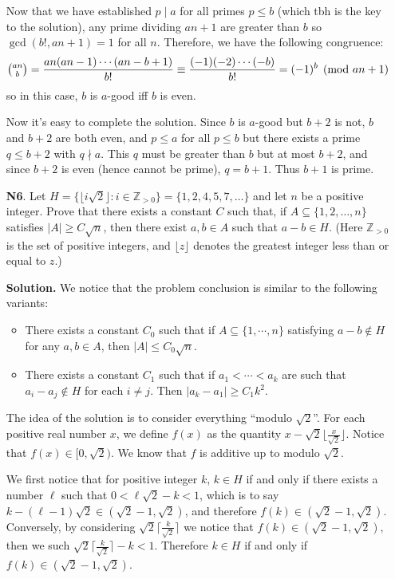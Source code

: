 \documentclass[11pt,a4paper]{article}
\begin{document}
\begin{enumerate}
	Now that we have established $p\mid a$ for all primes $p\le b$ (which tbh is the key to the solution), any prime dividing $an+1$ are greater than $b$ so $\gcd(b!, an+1)=1$ for all $n$. Therefore, we have the following congruence:
	$$
	\tbinom{an}{b}=\frac{an(an-1)\cdots (an-b+1)}{b!}\equiv\frac{(-1)(-2)\cdots (-b)}{b!}=(-1)^b\pmod{an+1}
	$$so in this case, $b$ is $a$-good iff $b$ is even.
	
	Now it's easy to complete the solution. Since $b$ is $a$-good but $b+2$ is not, $b$ and $b+2$ are both even, and $p\le a$ for all $p\le b$ but there exists a prime $q\le b+2$ with $q\nmid a$. This $q$ must be greater than $b$ but at most $b+2$, and since $b+2$ is even (hence cannot be prime), $q=b+1$. Thus $b+1$ is prime.
	
	\item[\textbf{N6}.] Let $H = \{ \lfloor i\sqrt{2}\rfloor : i \in \mathbb Z_{>0}\} = \{1,2,4,5,7,\dots \}$ and let $n$ be a positive integer. Prove that there exists a constant $C$ such that, if $A\subseteq \{1,2,\dots, n\}$ satisfies $|A| \ge C\sqrt{n}$, then there exist $a,b\in A$ such that $a-b\in H$. (Here $\mathbb Z_{>0}$ is the set of positive integers, and $\lfloor z\rfloor$ denotes the greatest integer less than or equal to $z$.)
	
	\textbf{Solution.} We notice that the problem conclusion is similar to the following variants: 
	\begin{itemize}
		\item There exists a constant $C_0$ such that if $A\subseteq \{1, \cdots , n\}$ satisfying $a-b\not\in H$ for any $a, b\in A$, then $|A|\le C_0\sqrt{n}$. 
		
		\item There exists a constant $C_1$ such that if $a_1 < \cdots < a_k$ are such that $a_i-a_j\not\in H$ for each $i\neq j$. Then $|a_k-a_1|\ge C_1k^2$. 
	\end{itemize}
	
	The idea of the solution is to consider everything ``modulo $\sqrt{2}$''. For each positive real number $x$, we define $f(x)$ as the quantity $x-\sqrt{2}\lfloor \frac{x}{\sqrt{2}}\rfloor$. Notice that $f(x)\in [0, \sqrt{2})$. We know that $f$ is additive up to modulo $\sqrt{2}$. 
	
	We first notice that for positive integer $k$, $k\in H$ if and only if there exists a number $\ell$ such that $0 < \ell\sqrt{2} - k < 1$, which is to say $k-(\ell - 1)\sqrt{2}\in (\sqrt{2}-1, \sqrt{2})$, and therefore $f(k)\in (\sqrt{2}-1, \sqrt{2})$. Conversely, by considering $\sqrt{2}\lceil\frac{k}{\sqrt{2}}\rceil$ we notice that $f(k)\in (\sqrt{2}-1, \sqrt{2})$, then we such $\sqrt{2}\lceil\frac{k}{\sqrt{2}}\rceil - k < 1$. 
	Therefore $k\in H$ if and only if $f(k)\in (\sqrt{2}-1, \sqrt{2})$. 
	

\end{enumerate}
\end{document}

